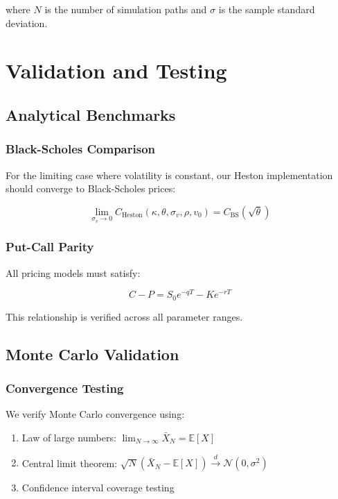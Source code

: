 \documentclass[12pt,a4paper]{article}
\begin{document}
where $N$ is the number of simulation paths and $\sigma$ is the sample standard deviation.

\section{Validation and Testing}

\subsection{Analytical Benchmarks}

\subsubsection{Black-Scholes Comparison}

For the limiting case where volatility is constant, our Heston implementation should converge to Black-Scholes prices:

\begin{equation}
\lim_{\sigma_v \to 0} C_{\text{Heston}}(\kappa, \theta, \sigma_v, \rho, v_0) = C_{\text{BS}}(\sqrt{\theta})
\end{equation}

\subsubsection{Put-Call Parity}

All pricing models must satisfy:

\begin{equation}
C - P = S_0 e^{-qT} - Ke^{-rT}
\end{equation}

This relationship is verified across all parameter ranges.

\subsection{Monte Carlo Validation}

\subsubsection{Convergence Testing}

We verify Monte Carlo convergence using:

\begin{enumerate}
    \item Law of large numbers: $\lim_{N \to \infty} \bar{X}_N = \mathbb{E}[X]$
    \item Central limit theorem: $\sqrt{N}(\bar{X}_N - \mathbb{E}[X]) \xrightarrow{d} \mathcal{N}(0, \sigma^2)$
    \item Confidence interval coverage testing
\end{enumerate}
\end{document}
